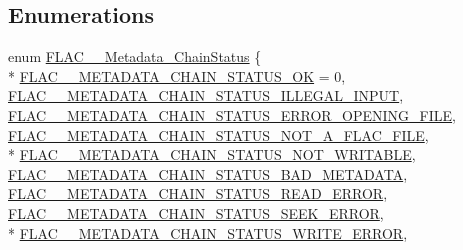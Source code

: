 \subsection*{Enumerations}
\begin{DoxyCompactItemize}
\item 
enum \hyperlink{group__flac__metadata__level2_gafe2a924893b0800b020bea8160fd4531}{F\+L\+A\+C\+\_\+\+\_\+\+Metadata\+\_\+\+Chain\+Status} \{ \\*
\hyperlink{group__flac__metadata__level2_ggafe2a924893b0800b020bea8160fd4531a293be942ec54576f2b3c73613af968e9}{F\+L\+A\+C\+\_\+\+\_\+\+M\+E\+T\+A\+D\+A\+T\+A\+\_\+\+C\+H\+A\+I\+N\+\_\+\+S\+T\+A\+T\+U\+S\+\_\+\+OK} = 0, 
\hyperlink{group__flac__metadata__level2_ggafe2a924893b0800b020bea8160fd4531a1be9400982f411173af46bf0c3acbdc7}{F\+L\+A\+C\+\_\+\+\_\+\+M\+E\+T\+A\+D\+A\+T\+A\+\_\+\+C\+H\+A\+I\+N\+\_\+\+S\+T\+A\+T\+U\+S\+\_\+\+I\+L\+L\+E\+G\+A\+L\+\_\+\+I\+N\+P\+UT}, 
\hyperlink{group__flac__metadata__level2_ggafe2a924893b0800b020bea8160fd4531a43d2741a650576052fa3615d8cd64d86}{F\+L\+A\+C\+\_\+\+\_\+\+M\+E\+T\+A\+D\+A\+T\+A\+\_\+\+C\+H\+A\+I\+N\+\_\+\+S\+T\+A\+T\+U\+S\+\_\+\+E\+R\+R\+O\+R\+\_\+\+O\+P\+E\+N\+I\+N\+G\+\_\+\+F\+I\+LE}, 
\hyperlink{group__flac__metadata__level2_ggafe2a924893b0800b020bea8160fd4531a99748a4b12ed10f9368375cc8deeb143}{F\+L\+A\+C\+\_\+\+\_\+\+M\+E\+T\+A\+D\+A\+T\+A\+\_\+\+C\+H\+A\+I\+N\+\_\+\+S\+T\+A\+T\+U\+S\+\_\+\+N\+O\+T\+\_\+\+A\+\_\+\+F\+L\+A\+C\+\_\+\+F\+I\+LE}, 
\\*
\hyperlink{group__flac__metadata__level2_ggafe2a924893b0800b020bea8160fd4531ac469c6543ebb117e99064572c16672d4}{F\+L\+A\+C\+\_\+\+\_\+\+M\+E\+T\+A\+D\+A\+T\+A\+\_\+\+C\+H\+A\+I\+N\+\_\+\+S\+T\+A\+T\+U\+S\+\_\+\+N\+O\+T\+\_\+\+W\+R\+I\+T\+A\+B\+LE}, 
\hyperlink{group__flac__metadata__level2_ggafe2a924893b0800b020bea8160fd4531a8efd2c76dc06308eb6eba59e1bc6300b}{F\+L\+A\+C\+\_\+\+\_\+\+M\+E\+T\+A\+D\+A\+T\+A\+\_\+\+C\+H\+A\+I\+N\+\_\+\+S\+T\+A\+T\+U\+S\+\_\+\+B\+A\+D\+\_\+\+M\+E\+T\+A\+D\+A\+TA}, 
\hyperlink{group__flac__metadata__level2_ggafe2a924893b0800b020bea8160fd4531a0525de5fb5d8aeeb4e848e33a8d503c6}{F\+L\+A\+C\+\_\+\+\_\+\+M\+E\+T\+A\+D\+A\+T\+A\+\_\+\+C\+H\+A\+I\+N\+\_\+\+S\+T\+A\+T\+U\+S\+\_\+\+R\+E\+A\+D\+\_\+\+E\+R\+R\+OR}, 
\hyperlink{group__flac__metadata__level2_ggafe2a924893b0800b020bea8160fd4531a5814bc26bcf92143198b8e7f028f43a2}{F\+L\+A\+C\+\_\+\+\_\+\+M\+E\+T\+A\+D\+A\+T\+A\+\_\+\+C\+H\+A\+I\+N\+\_\+\+S\+T\+A\+T\+U\+S\+\_\+\+S\+E\+E\+K\+\_\+\+E\+R\+R\+OR}, 
\\*
\hyperlink{group__flac__metadata__level2_ggafe2a924893b0800b020bea8160fd4531a66460c735e4745788b40889329e8489f}{F\+L\+A\+C\+\_\+\+\_\+\+M\+E\+T\+A\+D\+A\+T\+A\+\_\+\+C\+H\+A\+I\+N\+\_\+\+S\+T\+A\+T\+U\+S\+\_\+\+W\+R\+I\+T\+E\+\_\+\+E\+R\+R\+OR}, 

\end{DoxyCompactItemize}
